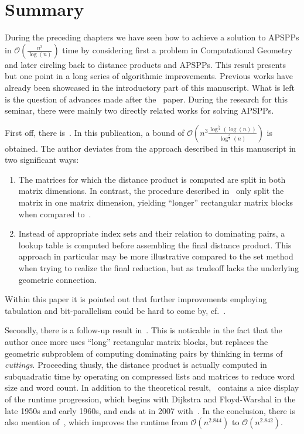 \chapter{Summary}\label{chap:summary}

During the preceding chapters we have seen how to achieve a solution to APSPPs in $\mathcal{O}\left( \frac{n^3}{\log(n)} \right)$ time by considering first a problem in Computational Geometry and later circling back to distance products and APSPPs.
This result presents but one point in a long series of algorithmic improvements.
Previous works have already been showcased in the introductory part of this manuscript.
What is left is the question of advances made after the~\cite{Chan2007} paper.
During the research for this seminar, there were mainly two directly related works for solving APSPPs.

First off, there is~\cite{Han2008}.
In this publication, a bound of $\mathcal{O}\left( n^3 {\frac{\log^{\frac{5}{4}}(\log(n))}{\log^{\frac{5}{4}}(n)}} \right)$ is obtained.
The author deviates from the approach described in this manuscript in two significant ways:
\begin{enumerate}
    \item %
        The matrices for which the distance product is computed are split in both matrix dimensions.
        In contrast, the procedure described in~\cite{Chan2007} only split the matrix in one matrix dimension, yielding ``longer'' rectangular matrix blocks when compared to~\cite{Han2008}.
    \item %
        Instead of appropriate index sets and their relation to dominating pairs, a lookup table is computed before assembling the final distance product.
        This approach in particular may be more illustrative compared to the set method when trying to realize the final reduction, but as tradeoff lacks the underlying geometric connection.
\end{enumerate}
Within this paper it is pointed out that further improvements employing tabulation and bit-parallelism could be hard to come by, cf.~\cite[Section~6]{Han2008}.

Secondly, there is a follow-up result in~\cite{Chan2010}.
This is noticable in the fact that the author once more uses ``long'' rectangular matrix blocks, but replaces the geometric subproblem of computing dominating pairs by thinking in terms of \emph{cuttings}.
Proceeding thusly, the distance product is actually computed in subquadratic time by operating on compressed lists and matrices to reduce word size and word count.
In addition to the theoretical result,\ \cite[Table~1.1]{Chan2010} contains a nice display of the runtime progression, which begins with Dijkstra and Floyd-Warshal in the late 1950s and early 1960s, and ends at in 2007 with~\cite{Chan2010}.
In the conclusion, there is also mention of~\cite{Yuster2009}, which improves the runtime from $\mathcal{O}\left( n^{2.844} \right)$ to $\mathcal{O}\left( n^{2.842} \right)$.

